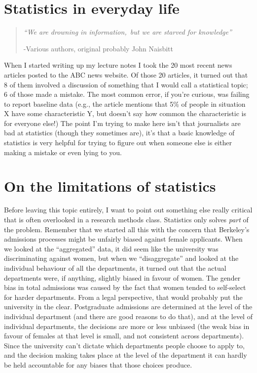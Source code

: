 \documentclass[]{book}
\begin{document}
\hypertarget{statistics-in-everyday-life}{%
\section{Statistics in everyday life}\label{statistics-in-everyday-life}}

\begin{quote}
\emph{``We are drowning in information,~but we are starved for knowledge''}

-Various authors, original probably John Naisbitt
\end{quote}

When I started writing up my lecture notes I took the 20 most recent news articles posted to the ABC news website. Of those 20 articles, it turned out that 8 of them involved a discussion of something that I would call a statistical topic; 6 of those made a mistake. The most common error, if you're curious, was failing to report baseline data (e.g., the article mentions that 5\% of people in situation X have some characteristic Y, but doesn't say how common the characteristic is for everyone else!) The point I'm trying to make here isn't that journalists are bad at statistics (though they sometimes are), it's that a basic knowledge of statistics is very helpful for trying to figure out when someone else is either making a mistake or even lying to you.

\hypertarget{on-the-limitations-of-statistics}{%
\section{On the limitations of statistics}\label{on-the-limitations-of-statistics}}

Before leaving this topic entirely, I want to point out something else really critical that is often overlooked in a research methods class. Statistics only solves \emph{part} of the problem. Remember that we started all this with the concern that Berkeley's admissions processes might be unfairly biased against female applicants. When we looked at the ``aggregated'' data, it did seem like the university was discriminating against women, but when we ``disaggregate'' and looked at the individual behaviour of all the departments, it turned out that the actual departments were, if anything, slightly biased in favour of women. The gender bias in total admissions was caused by the fact that women tended to self-select for harder departments. From a legal perspective, that would probably put the university in the clear. Postgraduate admissions are determined at the level of the individual department (and there are good reasons to do that), and at the level of individual departments, the decisions are more or less unbiased (the weak bias in favour of females at that level is small, and not consistent across departments). Since the university can't dictate which departments people choose to apply to, and the decision making takes place at the level of the department it can hardly be held accountable for any biases that those choices produce.
\end{document}
